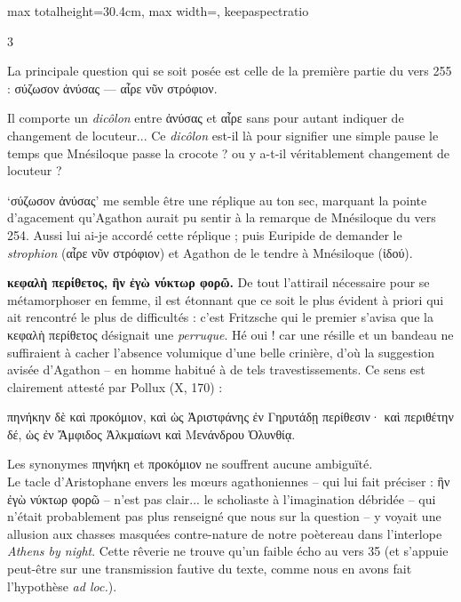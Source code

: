 \documentclass[11pt,twoside]{book}
\newcommand{\italique}[1]{\textit{#1}}
\newcommand{\citComm}[1]{\begin{quoting}[vskip=0.4pt,leftmargin=0.7em,rightmargin=0.2em]#1\end{quoting}}
\newcommand{\grec}[1]{{\policeGr #1}}
\begin{document}
\begin{adjustbox}{max totalheight=30.4cm, max width=\textwidth, keepaspectratio}
\begin{minipage}{\textwidth}
{\begin{multicols}{3}
\par\vspace{1.5pt}
\noindent La principale question qui se soit posée est celle de la première partie du vers 255 : σύζωσον ἀνύσας --- αἶρε νῦν στρόφιον.
\par\vspace{1.5pt}
\noindent Il comporte un \italique{dicôlon} entre ἀνύσας et αἶρε sans pour autant indiquer de changement de locuteur... Ce \italique{dicôlon} est-il là pour signifier une simple pause le temps que Mnésiloque passe la crocote ? ou y a-t-il véritablement changement de locuteur ?
\par\vspace{1.5pt}
\noindent `σύζωσον ἀνύσας' me semble être une réplique au ton sec, marquant la pointe d'agacement qu'Agathon aurait pu sentir à la remarque de Mnésiloque du vers 254. Aussi lui ai-je accordé cette réplique ; puis Euripide de demander le \italique{strophion} (αἶρε νῦν στρόφιον) et Agathon de le tendre à Mnésiloque (ἰδού).
\par\vspace{1.5pt}
 \textbf{κεφαλὴ περίθετος, ἣν ἐγὼ νύκτωρ φορῶ.} De tout l'attirail nécessaire pour se métamorphoser en femme, il est étonnant que ce soit le plus évident à priori qui ait rencontré le plus de difficultés : c'est Fritzsche qui le premier s'avisa que la \grec{κεφαλὴ περίθετος} désignait une \italique{perruque}. Hé oui ! car une résille et un bandeau ne suffiraient à cacher l'absence volumique d'une belle crinière, d'où la suggestion avisée d'Agathon – en homme habitué à de tels travestissements. Ce sens est clairement attesté par Pollux (X, 170) :
\citComm{\grec{πηνήκην δὲ καὶ προκόμιον, καὶ ὡς Ἀριστφάνης ἐν Γηρυτάδῃ περίθεσιν· καὶ περιθέτην δέ, ὡς ἐν Ἄμφιδος Ἀλκμαίωνι καὶ Μενάνδρου Ὀλυνθίᾳ.}}
\par\vspace{1.5pt}
\noindent Les synonymes \grec{πηνήκη} et \grec{προκόμιον} ne souffrent aucune ambiguïté.\\ Le tacle d'Aristophane envers les mœurs agathoniennes – qui lui fait préciser : ἣν ἐγὼ νύκτωρ φορῶ – n'est pas clair... le scholiaste à l'imagination débridée -- qui n'était probablement pas plus renseigné que nous sur la question -- y voyait une allusion aux chasses masquées contre-nature de notre poètereau dans l'interlope \italique{Athens by night}. Cette rêverie ne trouve qu'un faible écho au vers 35 (et s'appuie peut-être sur une transmission fautive du texte, comme nous en avons fait l'hypothèse \italique{ad loc.}).

\end{multicols}}
\end{minipage}
\end{adjustbox}
\end{document}

